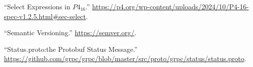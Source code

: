 \documentclass[11pt]{article}
\begin{document}
{{\begin{thebibliography}{45}
\mdbibitemlabel{{}[31]}\textquotedblleft{}Select Expressions in $P4_{16}$.\textquotedblright{} \href{https://p4.org/wp-content/uploads/2024/10/P4-16-spec-v1.2.5.html\%23sec-select}{{\ttfamily https://\hspace{0pt}p4.\hspace{0pt}org/\hspace{0pt}wp-\hspace{0pt}content/\hspace{0pt}uploads/\hspace{0pt}2024/\hspace{0pt}10/\hspace{0pt}P4-\hspace{0pt}16-\hspace{0pt}spec-\hspace{0pt}v1.\hspace{0pt}2.\hspace{0pt}5.\hspace{0pt}html\#\hspace{0pt}sec-\hspace{0pt}select}}.\label{p4selectexpr}%

\mdbibitemlabel{{}[32]}\textquotedblleft{}Semantic Versioning.\textquotedblright{} \href{https://semver.org/}{{\ttfamily https://\hspace{0pt}semver.\hspace{0pt}org/\hspace{0pt}}}.\label{semver}%

\mdbibitemlabel{{}[33]}\textquotedblleft{}Status.proto:the Protobuf Status Message.\textquotedblright{} \href{https://github.com/grpc/grpc/blob/master/src/proto/grpc/status/status.proto}{{\ttfamily https://\hspace{0pt}github.\hspace{0pt}com/\hspace{0pt}grpc/\hspace{0pt}grpc/\hspace{0pt}blob/\hspace{0pt}master/\hspace{0pt}src/\hspace{0pt}proto/\hspace{0pt}grpc/\hspace{0pt}status/\hspace{0pt}status.\hspace{0pt}proto}}.\label{protostatus}%


\end{thebibliography}}}
\end{document}
